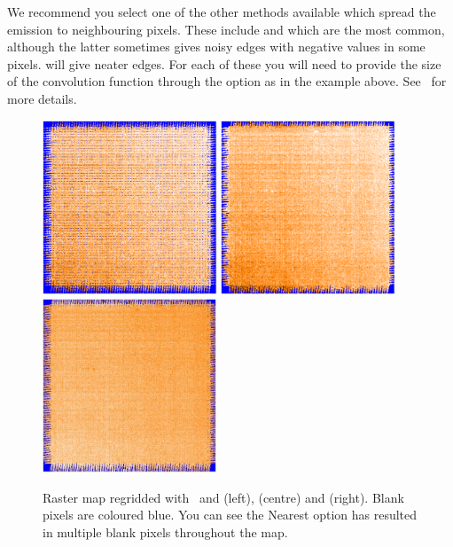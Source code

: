 \documentclass[11pt,oneside,chapters]{starlink}
\begin{document}
We recommend you select one of the other methods available which
spread the emission to neighbouring pixels.  These include
 and  which are the most common, although
the latter sometimes gives noisy edges with negative values in some
pixels.  will give neater edges. For each of these you
will need to provide the size of the convolution function through the
 option as in the example above. See \smurfsun\ for more
details.


\begin{figure}[h!]
\begin{center}
\includegraphics[width=5.2cm, height=5.2cm]{sc20_nearest}
\includegraphics[width=5.2cm, height=5.2cm]{sc20_gauss}
\includegraphics[width=5.2cm, height=5.2cm]{sc20_sincsinc}
\caption[Options for the \makecube\ parameter `spread']{\label{fig:spread}
  Raster map regridded with \makecube\ and 
  (left),  (centre) and  (right). Blank
  pixels are coloured blue. You can see the Nearest option has
  resulted in multiple blank pixels throughout the map.}
\end{center}
\end{figure}
\end{document}
